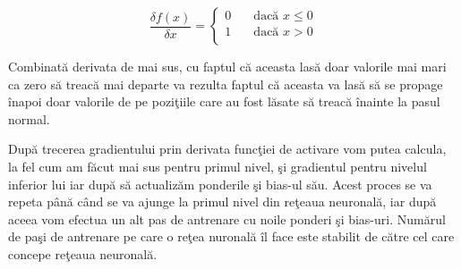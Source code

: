 \[ \frac{\delta f(x)}{\delta x}  =
  \begin{cases}
    0       & \quad \text{dac\u{a} } x \leq 0\\
    1  & \quad \text{dac\u{a} } x > 0\\
  \end{cases}
\]

Combinat\u{a} derivata de mai sus, cu faptul c\u{a} aceasta las\u{a} doar valorile mai mari ca zero s\u{a} treac\u{a} mai departe va rezulta faptul c\u{a} aceasta va las\u{a} s\u{a} se propage \^{i}napoi doar valorile de pe pozi\c{t}iile care au fost l\u{a}sate s\u{a} treac\u{a} \^{i}nainte la pasul normal.

\par

Dup\u{a} trecerea gradientului prin derivata func\c{t}iei de activare vom putea calcula, la fel cum am f\u{a}cut mai sus pentru primul nivel, \c{s}i gradientul pentru nivelul inferior lui iar dup\u{a} s\u{a} actualiz\u{a}m ponderile \c{s}i bias-ul s\u{a}u. Acest proces se va repeta p\^{a}n\u{a} c\^{a}nd se va ajunge la primul nivel din re\c{t}eaua neuronal\u{a}, iar dup\u{a} aceea vom efectua un alt pas de antrenare cu noile ponderi \c{s}i bias-uri. Num\u{a}rul de pa\c{s}i de antrenare pe care o re\c{t}ea nuronal\u{a} \^{i}l face este stabilit de c\u{a}tre cel care concepe re\c{t}eaua neuronal\u{a}.